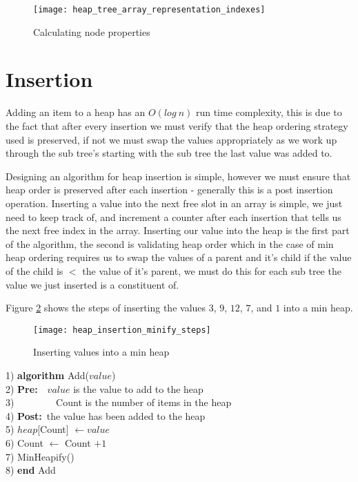 \begin{figure}
\begin{center}
\texttt{[image: heap\_tree\_array\_representation\_indexes]}
\caption{Calculating node properties} \label{fig:heap_tree_array_representation_indexes}
\end{center}
\end{figure}

\section{Insertion}
Adding an item to a heap has an $O(log~n)$ run time complexity, this is due to the fact that after every insertion we must verify that the heap ordering strategy used is preserved, if not we must swap the values appropriately as we work up through the sub tree's starting with the sub tree the last value was added to.


Designing an algorithm for heap insertion is simple, however we must ensure that heap order is preserved after each insertion - generally this is a post insertion operation. Inserting a value into the next free slot in an array is simple, we just need to keep track of, and increment a counter after each insertion that tells us the next free index in the array. Inserting our value into the heap is the first part of the algorithm, the second is validating heap order which in the case of min heap ordering requires us to swap the values of a parent and it's child if the value of the child is $<$ the value of it's parent, we must do this for each sub tree the value we just inserted is a constituent of.

Figure \ref{fig:heap_insertion_minify_steps} shows the steps of inserting the values $3$, $9$, $12$, $7$, and $1$ into a min heap.

\begin{figure}
\begin{center}
\texttt{[image: heap\_insertion\_minify\_steps]}
\end{center}
\caption{Inserting values into a min heap} \label{fig:heap_insertion_minify_steps}
\end{figure}

\begin{tabbing}
1)  \textbf{alg}\= \textbf{orithm} Add($value$) \\
2)  \> \textbf{Pre:}~~$value$ is the value to add to the heap \\
3)  \> ~~~~~~~~Count is the number of items in the heap \\
4)  \> \textbf{Post:}~the value has been added to the heap \\
5)  \> $heap$[Count] $\leftarrow value$ \\
6)  \> Count $\leftarrow$ Count $+ 1$ \\
7)  \> MinHeapify() \\
8)  \textbf{end} Add \\
\end{tabbing}

